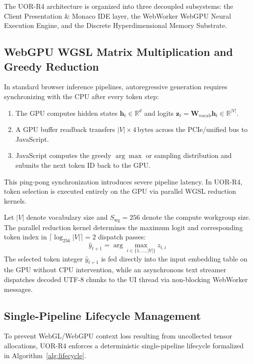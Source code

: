 \documentclass[11pt,a4paper]{article}
\theoremstyle{plain}
\theoremstyle{definition}
\theoremstyle{remark}
\begin{document}
The UOR-R4 architecture is organized into three decoupled subsystems: the Client Presentation \& Monaco IDE layer, the WebWorker WebGPU Neural Execution Engine, and the Discrete Hyperdimensional Memory Substrate.

\subsection{WebGPU WGSL Matrix Multiplication and Greedy Reduction}

In standard browser inference pipelines, autoregressive generation requires synchronizing with the CPU after every token step:
\begin{enumerate}
    \item The GPU computes hidden states $\bm{h}_t \in \mathbb{R}^d$ and logits $\bm{z}_t = \bm{W}_{\text{vocab}} \bm{h}_t \in \mathbb{R}^{|V|}$.
    \item A GPU buffer readback transfers $|V| \times 4\,\text{bytes}$ across the PCIe/unified bus to JavaScript.
    \item JavaScript computes the greedy $\arg\max$ or sampling distribution and submits the next token ID back to the GPU.
\end{enumerate}

This ping-pong synchronization introduces severe pipeline latency. In UOR-R4, token selection is executed entirely on the GPU via parallel WGSL reduction kernels.

Let $|V|$ denote vocabulary size and $S_{\text{wg}} = 256$ denote the compute workgroup size. The parallel reduction kernel determines the maximum logit and corresponding token index in $\lceil \log_{256} |V| \rceil = 2$ dispatch passes:
\begin{equation}
\hat{y}_{t+1} = \arg\max_{i \in \{1, \dots, |V|\}} z_{t, i}
\end{equation}
The selected token integer $\hat{y}_{t+1}$ is fed directly into the input embedding table on the GPU without CPU intervention, while an asynchronous text streamer dispatches decoded UTF-8 chunks to the UI thread via non-blocking WebWorker messages.

\subsection{Single-Pipeline Lifecycle Management}

To prevent WebGL/WebGPU context loss resulting from uncollected tensor allocations, UOR-R4 enforces a deterministic single-pipeline lifecycle formalized in Algorithm~\ref{alg:lifecycle}.
\end{document}
